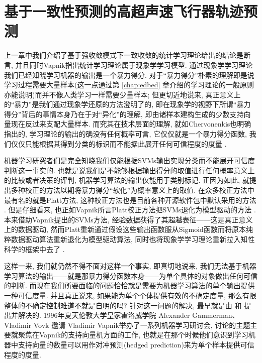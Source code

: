 \chapter{基于一致性预测的高超声速飞行器轨迹预测}\label{chap:cp-HFV}
上一章中我们介绍了基于强收敛模式下一致收敛的统计学习理论给出的结论是断言, 并且同时Vapnik指出统计学习理论属于现象学学习模型\citep{vapnik2020,Husserl1937,wangdefeng-xianxiangxue-2005}. 通过现象学学习理论我们已经知晓学习机器的输出是一个暴力得分\citep{vapniktalk2015}. 对于“暴力得分”朴素的理解即是说学习过程需要大量样本(这一点通过第 \ref{chap:edbed} 章介绍的学习理论的一般原则亦能说明)而并不像人类学习一样需要少量样本; 但更切近地说来, 真正意义上的“暴力”是我们通过现象学还原的方法澄明了的, 即在现象学的视野下所谓“暴力得分”背后的事情本身乃在于对“异化”的理解, 即由诸样本建构生成的少数支持向量现在反过来支配大量样本. 而究其在技术层面的理解, 就如Chervonenkis也明确指出的, 学习理论的输出的确没有任何概率可言, 它仅仅就是一个暴力得分函数, 我们仅仅只能根据其得到分类的标识而不能据此展开任何可信程度的度量 \citep[p. 22]{2006Hedging}. 

机器学习研究者们是完全知晓我们仅能根据SVMs输出实现分类而不能展开可信度判断这一事实的. 也就是说我们是不能够根据输出得分的取值进行任何概率意义上的比较或者决策的评判, 机器学习算法的输出仅能用于类别标记. 正因为如此, 就提出多种校正的方法以期将暴力得分“软化”为概率意义上的取值. 在众多校正方法中最有名的就是Platt方法, 这种校正方法也是目前各种开源软件包中默认采用的方法 \citep{Platt1999}. 但是仔细看来, 也正如Vapnik所言Platt校正方法把SVMs退化为模型驱动的方法 \citep{Vapnik2021}. 本来借助Vapnik提出的SVMs方法, 经验数据获得了其超越表征——这是真正意义上的数据驱动,  然而Platt重新通过假设这些输出函数服从Sigmoid函数而将原本纯粹数据驱动算法重新退化为模型驱动算法, 同时也将现象学学习理论重新拉入知性科学的框架中去了 \citep{Vapnik-Synergy-2016}.

这样一来, 我们就仍然不得不面对这样一个事实, 即真切地说来, 我们无法基于机器学习算法的输出——就是那暴力得分函数本身——\textsf{为单个具体的对象}做出任何可信的判断. 而现在我们所要面临的问题恰恰就是需要为机器学习算法的\textsf{单个输出}提供一种可信度量. 并且真正说来, 如果能为单个个体提供有效的不确定度量, 那么有限整体的不确定控制难道不就是自明的吗? 针对这一问题的解决, 最早就是由 \citet{soton1999} 和 \citet{Saunders1999} 提出并解决的. 1996年夏天伦敦大学皇家霍洛威学院 Alexander Gammerman、Vladimir Vovk 邀请 Vladimir Vapnik举办了一系列机器学习研讨会, 讨论的主题主要就聚焦在Vapnik的支持向量机方面的工作, 也就是在那个时候他们意识到学习机器中支持向量的数量可以用作对冲预测(hedged prediction)来为单个样本提供可信程度的度量. 

